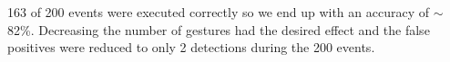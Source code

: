 163 of 200 events were executed correctly so we end up with an accuracy of $\sim$ 82\%. Decreasing the number of gestures had the desired effect and the false positives were reduced to only 2 detections during the 200 events.


































